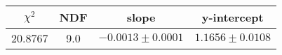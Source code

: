 \begin{tabular}{|c|c|c|c|}

\hline
$\chi^{2}$ & NDF & slope & y-intercept  \\
\hline
20.8767 & 9.0 & $-0.0013\pm0.0001$ & $1.1656\pm0.0108$ \\
\hline

\end{tabular}